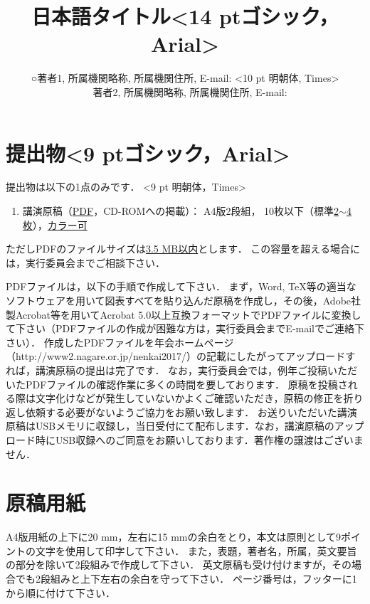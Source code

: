 \documentclass[]{nenkai2019}
\title{日本語タイトル\textless14 ptゴシック，Arial\textgreater}
\author{○著者1, 所属機関略称, 所属機関住所, E-mail: \textless 10 pt 明朝体, Times\textgreater\\
        　著者2, 所属機関略称, 所属機関住所, E-mail:}
\begin{document}
\maketitle
\section{提出物\textless 9 ptゴシック，Arial\textgreater}
提出物は以下の1点のみです．
\textless 9 pt 明朝体，Times\textgreater
%
\begin{enumerate}
 \item[(1)] 講演原稿（\underline{PDF}，CD-ROMへの掲載）： A4版2段組，
 10枚以下（標準\underline{2$\sim$4枚}），\underline{カラー可}
\end{enumerate}
%
ただしPDFのファイルサイズは\underline{3.5 MB以内}とします．
この容量を超える場合には，実行委員会までご相談下さい．

PDFファイルは，以下の手順で作成して下さい．
まず，Word, TeX等の適当なソフトウェアを用いて図表すべてを貼り込んだ原稿を作成し，その後，Adobe社製Acrobat等を用いてAcrobat 5.0以上互換フォーマットでPDFファイルに変換して下さい（PDFファイルの作成が困難な方は，実行委員会までE-mailでご連絡下さい）．
作成したPDFファイルを年会ホームページ（http://www2.nagare.or.jp/nenkai2017/）の記載にしたがってアップロードすれば，講演原稿の提出は完了です．
なお，実行委員会では，例年ご投稿いただいたPDFファイルの確認作業に多くの時間を要しております．
原稿を投稿される際は文字化けなどが発生していないかよくご確認いただき，原稿の修正を折り返し依頼する必要がないようご協力をお願い致します．
お送りいただいた講演原稿はUSBメモリに収録し，当日受付にて配布します．なお，講演原稿のアップロード時にUSB収録へのご同意をお願いしております．著作権の譲渡はございません．


\section{原稿用紙}
A4版用紙の上下に20 mm，左右に15 mmの余白をとり，本文は原則として9ポイントの文字を使用して印字して下さい．
また，表題，著者名，所属，英文要旨の部分を除いて2段組みで作成して下さい．
英文原稿も受け付けますが，その場合でも2段組みと上下左右の余白を守って下さい．
ページ番号は，フッターに1から順に付けて下さい．
\end{document}
